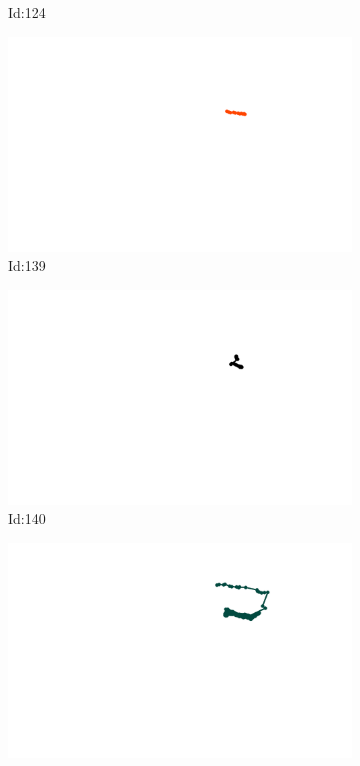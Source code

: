 \documentclass[12pt,twoside]{report}
\begin{document}
\begin{figure}
\begin{subfigure}[b]{0.20\textwidth}
\caption{Id:124}
\end{subfigure}
\begin{subfigure}[b]{0.20\textwidth}
\centering
\includegraphics[width=\textwidth]{../trajectories/139.png}
\caption{Id:139}
\end{subfigure}
\begin{subfigure}[b]{0.20\textwidth}
\centering
\includegraphics[width=\textwidth]{../trajectories/140.png}
\caption{Id:140}
\end{subfigure}
\begin{subfigure}[b]{0.20\textwidth}
\centering
\includegraphics[width=\textwidth]{../trajectories/143.png}

\end{subfigure}
\end{figure}
\end{document}
